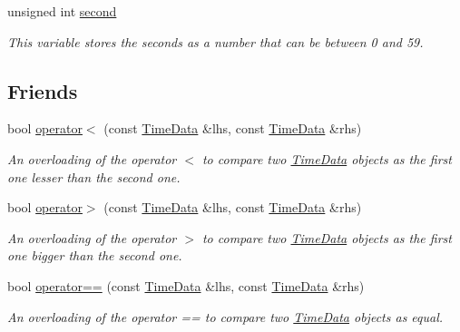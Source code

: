 \begin{DoxyCompactItemize}
\mbox{\label{structTimeData_ac17cd0725bea21f3be277d2c9a00e3d8}} 
unsigned int \hyperlink{structTimeData_ac17cd0725bea21f3be277d2c9a00e3d8}{second}
\begin{DoxyCompactList}\small\item\em This variable stores the seconds as a number that can be between 0 and 59. \end{DoxyCompactList}\end{DoxyCompactItemize}
\subsection*{Friends}
\begin{DoxyCompactItemize}
\item 
\mbox{\label{structTimeData_a05ed1f021fd859fd0507d8ec74de5afd}} 
bool \hyperlink{structTimeData_a05ed1f021fd859fd0507d8ec74de5afd}{operator$<$} (const \hyperlink{structTimeData}{Time\+Data} \&lhs, const \hyperlink{structTimeData}{Time\+Data} \&rhs)
\begin{DoxyCompactList}\small\item\em An overloading of the operator $<$ to compare two \hyperlink{structTimeData}{Time\+Data} objects as the first one lesser than the second one. \end{DoxyCompactList}\item 
\mbox{\label{structTimeData_a6ba5c50a9564dae90072889e68cc8a42}} 
bool \hyperlink{structTimeData_a6ba5c50a9564dae90072889e68cc8a42}{operator$>$} (const \hyperlink{structTimeData}{Time\+Data} \&lhs, const \hyperlink{structTimeData}{Time\+Data} \&rhs)
\begin{DoxyCompactList}\small\item\em An overloading of the operator $>$ to compare two \hyperlink{structTimeData}{Time\+Data} objects as the first one bigger than the second one. \end{DoxyCompactList}\item 
\mbox{\label{structTimeData_a77e7e3db1d21909c98eb40309a3ac989}} 
bool \hyperlink{structTimeData_a77e7e3db1d21909c98eb40309a3ac989}{operator==} (const \hyperlink{structTimeData}{Time\+Data} \&lhs, const \hyperlink{structTimeData}{Time\+Data} \&rhs)
\begin{DoxyCompactList}\small\item\em An overloading of the operator == to compare two \hyperlink{structTimeData}{Time\+Data} objects as equal. \end{DoxyCompactList}\end{DoxyCompactItemize}



